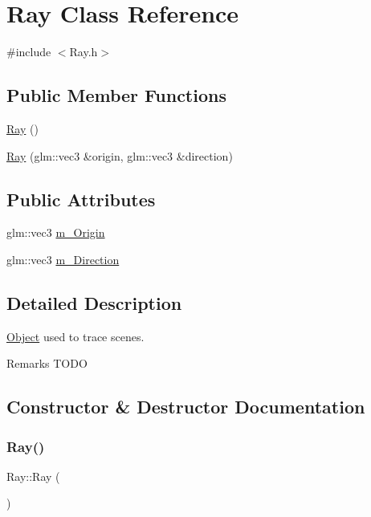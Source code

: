 \hypertarget{class_ray}{}\section{Ray Class Reference}
\label{class_ray}


{\ttfamily \#include $<$Ray.\+h$>$}

\subsection*{Public Member Functions}
\begin{DoxyCompactItemize}
\item 
\hyperlink{class_ray_a2e3d2c29f2df4ab3da10da79d4acb852}{Ray} ()
\item 
\hyperlink{class_ray_ae5670c390428ae21b8066329d87e1ad9}{Ray} (glm\+::vec3 \&origin, glm\+::vec3 \&direction)
\end{DoxyCompactItemize}
\subsection*{Public Attributes}
\begin{DoxyCompactItemize}
\item 
glm\+::vec3 \hyperlink{class_ray_ab94919c6ebaa2fd3628d8bc85669e79a}{m\+\_\+\+Origin}
\item 
glm\+::vec3 \hyperlink{class_ray_a1fe0679dfa9ead77bf81d4c7a8b87175}{m\+\_\+\+Direction}
\end{DoxyCompactItemize}


\subsection{Detailed Description}
\hyperlink{class_object}{Object} used to trace scenes. \begin{DoxyRemark}{Remarks}
T\+O\+DO 
\end{DoxyRemark}


\subsection{Constructor \& Destructor Documentation}
\hypertarget{class_ray_a2e3d2c29f2df4ab3da10da79d4acb852}{}\label{class_ray_a2e3d2c29f2df4ab3da10da79d4acb852} 
\subsubsection{\texorpdfstring{Ray()}{Ray()}\hspace{0.1cm}{\footnotesize\ttfamily [1/2]}}
{\footnotesize\ttfamily Ray\+::\+Ray (\begin{DoxyParamCaption}{ }\end{DoxyParamCaption})}

